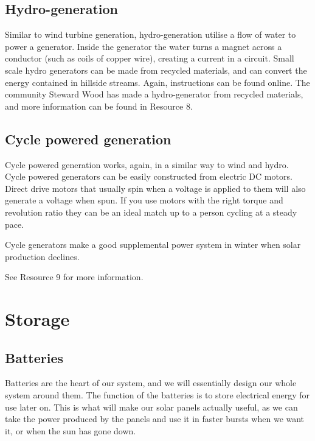 \documentclass{article}
\theoremstyle{definition}
\theoremstyle{definition}
\theoremstyle{remark}
\begin{document}
  {\color{blue}\subsection{Hydro-generation}} %
  \label{sub:hydro_generation}

    Similar to wind turbine generation, hydro-generation utilise a flow of water to power a generator. Inside the generator the water turns a magnet across a conductor (such as coils of copper wire), creating a current in a circuit. Small scale hydro generators can be made from recycled materials, and can convert the energy contained in hillside streams. Again, instructions can be found online. The community Steward Wood has made a hydro-generator from recycled materials, and more information can be found in Resource 8.
  

  {\color{blue}\subsection{Cycle powered generation}} %
  \label{sub:cycle_powered_generation}

    Cycle powered generation works, again, in a similar way to wind and hydro. Cycle powered generators can be easily constructed from electric DC motors. Direct drive motors that usually spin when a voltage is applied to them will also generate a voltage when spun. If you use motors with the right torque and revolution ratio they can be an ideal match up to a person cycling at a steady pace.

    Cycle generators make a good supplemental power system in winter when solar production declines.

    See Resource 9 for more information.
  


{\color{blue}\section{Storage}} %
\label{sec:storage}

  {\color{blue}\subsection{Batteries}} %
  \label{sub:batteries}

    Batteries are the heart of our system, and we will essentially design our whole system around them. The function of the batteries is to store electrical energy for use later on. This is what will make our solar panels actually useful, as we can take the power produced by the panels and use it in faster bursts when we want it, or when the sun has gone down. 
\end{document}
